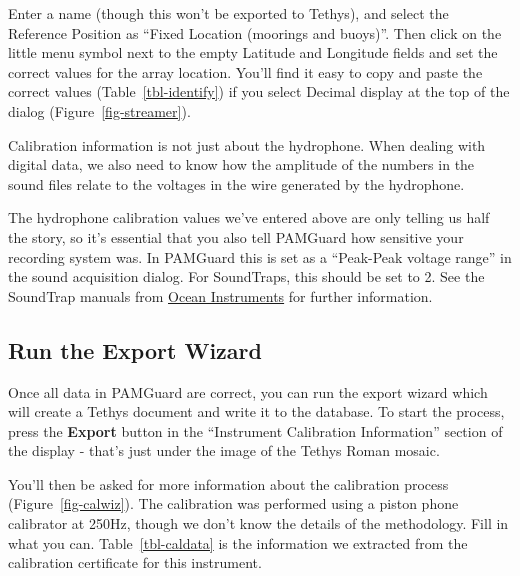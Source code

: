 \documentclass[
]{article}
\begin{document}
Enter a name (though this won't be exported to Tethys), and select the
Reference Position as ``Fixed Location (moorings and buoys)''. Then
click on the little menu symbol next to the empty Latitude and Longitude
fields and set the correct values for the array location. You'll find it
easy to copy and paste the correct values (Table~\ref{tbl-identify}) if
you select Decimal display at the top of the dialog
(Figure~\ref{fig-streamer}).

\begin{tcolorbox}[enhanced jigsaw, opacitybacktitle=0.6, colbacktitle=quarto-callout-important-color!10!white, opacityback=0, bottomtitle=1mm, left=2mm, arc=.35mm, title=\textcolor{quarto-callout-important-color}{\faExclamation}\hspace{0.5em}{Complete Calibration Data}, toptitle=1mm, toprule=.15mm, breakable, colframe=quarto-callout-important-color-frame, titlerule=0mm, bottomrule=.15mm, rightrule=.15mm, coltitle=black, colback=white, leftrule=.75mm]

Calibration information is not just about the hydrophone. When dealing
with digital data, we also need to know how the amplitude of the numbers
in the sound files relate to the voltages in the wire generated by the
hydrophone.

The hydrophone calibration values we've entered above are only telling
us half the story, so it's essential that you also tell PAMGuard how
sensitive your recording system was. In PAMGuard this is set as a
``Peak-Peak voltage range'' in the sound acquisition dialog. For
SoundTraps, this should be set to 2. See the SoundTrap manuals from
\href{https://www.oceaninstruments.co.nz/}{Ocean Instruments} for
further information.

\end{tcolorbox}

\subsection{Run the Export Wizard}\label{run-the-export-wizard}

Once all data in PAMGuard are correct, you can run the export wizard
which will create a Tethys document and write it to the database. To
start the process, press the \textbf{Export} button in the ``Instrument
Calibration Information'' section of the display - that's just under the
image of the Tethys Roman mosaic.

You'll then be asked for more information about the calibration process
(Figure~\ref{fig-calwiz}). The calibration was performed using a piston
phone calibrator at 250Hz, though we don't know the details of the
methodology. Fill in what you can. Table~\ref{tbl-caldata} is the
information we extracted from the calibration certificate for this
instrument.
\end{document}
